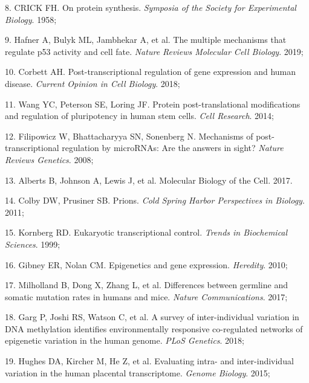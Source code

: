 \documentclass[11pt,oneside]{bristolthesis}
\newenvironment{cslreferences}%
  {}%
  {\par}
\begin{document}
\begin{cslreferences}
\leavevmode\hypertarget{ref-CRICK1958}{}%
8. CRICK FH. On protein synthesis. \emph{Symposia of the Society for Experimental Biology}. 1958;

\leavevmode\hypertarget{ref-Hafner2019}{}%
9. Hafner A, Bulyk ML, Jambhekar A, et al. The multiple mechanisms that regulate p53 activity and cell fate. \emph{Nature Reviews Molecular Cell Biology}. 2019;

\leavevmode\hypertarget{ref-Corbett2018}{}%
10. Corbett AH. Post-transcriptional regulation of gene expression and human disease. \emph{Current Opinion in Cell Biology}. 2018;

\leavevmode\hypertarget{ref-Wang2014}{}%
11. Wang YC, Peterson SE, Loring JF. Protein post-translational modifications and regulation of pluripotency in human stem cells. \emph{Cell Research}. 2014;

\leavevmode\hypertarget{ref-Filipowicz2008}{}%
12. Filipowicz W, Bhattacharyya SN, Sonenberg N. Mechanisms of post-transcriptional regulation by microRNAs: Are the answers in sight? \emph{Nature Reviews Genetics}. 2008;

\leavevmode\hypertarget{ref-Alberts2017}{}%
13. Alberts B, Johnson A, Lewis J, et al. Molecular Biology of the Cell. 2017.

\leavevmode\hypertarget{ref-Colby2011}{}%
14. Colby DW, Prusiner SB. Prions. \emph{Cold Spring Harbor Perspectives in Biology}. 2011;

\leavevmode\hypertarget{ref-Kornberg1999}{}%
15. Kornberg RD. Eukaryotic transcriptional control. \emph{Trends in Biochemical Sciences}. 1999;

\leavevmode\hypertarget{ref-Gibney2010}{}%
16. Gibney ER, Nolan CM. Epigenetics and gene expression. \emph{Heredity}. 2010;

\leavevmode\hypertarget{ref-Milholland2017}{}%
17. Milholland B, Dong X, Zhang L, et al. Differences between germline and somatic mutation rates in humans and mice. \emph{Nature Communications}. 2017;

\leavevmode\hypertarget{ref-Garg2018}{}%
18. Garg P, Joshi RS, Watson C, et al. A survey of inter-individual variation in DNA methylation identifies environmentally responsive co-regulated networks of epigenetic variation in the human genome. \emph{PLoS Genetics}. 2018;

\leavevmode\hypertarget{ref-Hughes2015}{}%
19. Hughes DA, Kircher M, He Z, et al. Evaluating intra- and inter-individual variation in the human placental transcriptome. \emph{Genome Biology}. 2015;


\end{cslreferences}
\end{document}
